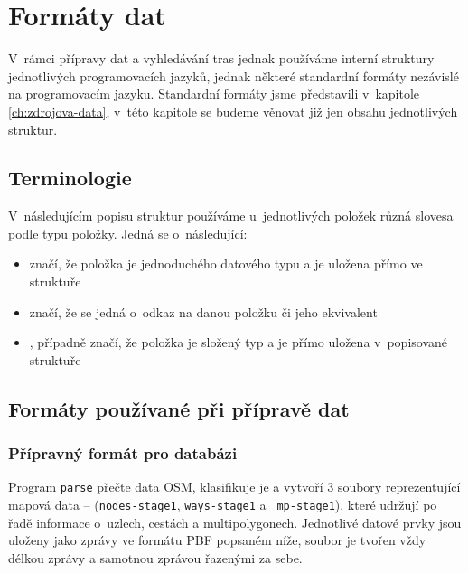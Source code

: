 \chapter{Formáty dat}
\label{ch:formaty-dat}
V~rámci přípravy dat a vyhledávání tras jednak používáme interní struktury
jednotlivých programovacích jazyků, jednak některé standardní formáty nezávislé
na programovacím jazyku. Standardní formáty jsme představili v~kapitole
\ref{ch:zdrojova-data}, v~této kapitole se budeme věnovat již jen obsahu
jednotlivých struktur.


\section{Terminologie}
V~následujícím popisu struktur používáme u~jednotlivých položek různá slovesa
podle typu položky. Jedná se o~následující:
\begin{itemize}
	\item {} značí, že položka je jednoduchého datového typu a je
		uložena přímo ve struktuře
	\item {} značí, že se jedná o~odkaz na danou položku či jeho
		ekvivalent
	\item {}, případně  značí, že položka je
		složený typ a je přímo uložena v~popisované struktuře
\end{itemize}

\section{Formáty používané při přípravě dat}
\label{ch:formaty:priprava}
\subsection{Přípravný formát pro databázi}
Program {\tt parse} přečte data OSM, klasifikuje je a vytvoří 3 soubory
reprezentující mapová data -- ({\tt nodes-stage1}, {\tt ways-stage1} a {\tt
mp-stage1}), které udržují po řadě
informace o~uzlech, cestách a multipolygonech. Jednotlivé datové prvky jsou
uloženy jako zprávy ve formátu PBF popsaném níže, soubor je tvořen vždy délkou
zprávy a samotnou zprávou řazenými za sebe. 

